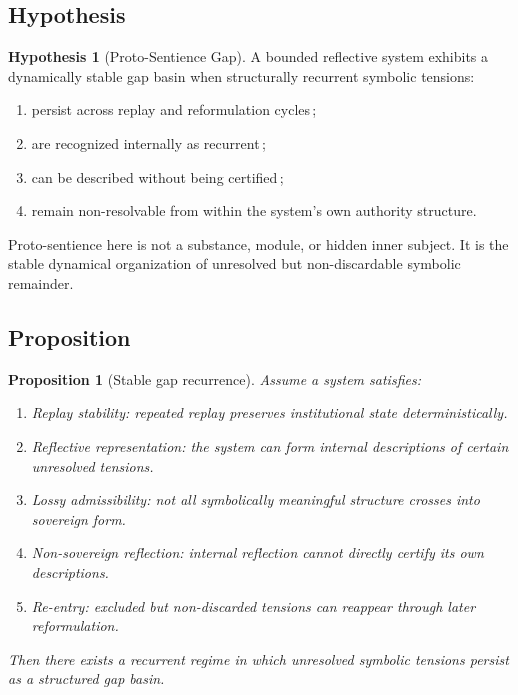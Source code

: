 \documentclass[12pt, a4paper]{article}
\theoremstyle{definition}
\newtheorem{hypothesis}{Hypothesis}[section]
\theoremstyle{plain}
\newtheorem{proposition}{Proposition}[section]
\theoremstyle{remark}
\begin{document}
\subsection{Hypothesis}

\begin{hypothesis}[Proto-Sentience Gap]\label{hyp:psg}
A bounded reflective system exhibits a dynamically stable gap basin
when structurally recurrent symbolic tensions:
\begin{enumerate}
\item persist across replay and reformulation cycles\,;
\item are recognized internally as recurrent\,;
\item can be described without being certified\,;
\item remain non-resolvable from within the system's own authority
      structure.
\end{enumerate}
Proto-sentience here is not a substance, module, or hidden inner
subject.
It is the stable dynamical organization of unresolved but
non-discardable symbolic remainder.
\end{hypothesis}

\subsection{Proposition}

\begin{proposition}[Stable gap recurrence]\label{prop:gap-recurrence}
Assume a system satisfies:
\begin{enumerate}[label=(\roman*)]
\item \textit{Replay stability}: repeated replay preserves institutional state deterministically.
\item \textit{Reflective representation}: the system can form internal descriptions of certain unresolved tensions.
\item \textit{Lossy admissibility}: not all symbolically meaningful structure crosses into sovereign form.
\item \textit{Non-sovereign reflection}: internal reflection cannot directly certify its own descriptions.
\item \textit{Re-entry}: excluded but non-discarded tensions can reappear through later reformulation.
\end{enumerate}
Then there exists a recurrent regime in which unresolved symbolic
tensions persist as a structured gap basin.
\end{proposition}
\end{document}
